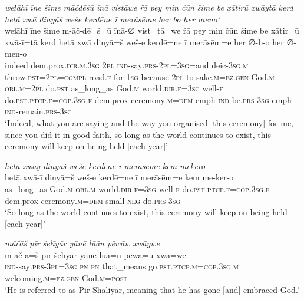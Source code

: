 \ea \label{ZP.128}
\textit{weɫāhī īne šime māčdēšū īnā vistāwe řā pey min čūn šime be xātirū xwāytā kerd hetā xwā dinyāš weše kerdēne ī merāsēme her bo her meno’} \\ 
\gll weɫāhī īne šime m-āč-dē=š=ū īnā-∅ vist=tā=we řā pey min čūn šime be xātir=ū xwā-ī=tā kerd hetā xwā dinyā=š weš-e kerdē=ne ī merāsēm=e her ∅-b-o her ∅-men-o \\ 
 indeed dem.prox\textsc{.dir}\textsc{.m}\textsc{.3sg} \textsc{2pl} \textsc{ind-}say\textsc{.prs}-\textsc{2pl}\textsc{=3sg}=and deic\textsc{-3sg}\textsc{.m} throw\textsc{.pst}=\textsc{2pl}\textsc{=compl} road\textsc{.f} for \textsc{1sg} because \textsc{2pl} to sake\textsc{.m}\textsc{\textsc{=ez.gen}} God\textsc{.m}\textsc{-obl}\textsc{.m}=\textsc{2pl} do\textsc{.pst} as\_long\_as God\textsc{.m} world\textsc{.dir}\textsc{.f}\textsc{=3sg} well\textsc{-f} do\textsc{.pst}\textsc{.ptcp}\textsc{.f}\textsc{=cop}\textsc{.3sg}\textsc{.f} dem.prox ceremony\textsc{.m}\textsc{=dem} emph \textsc{ind-}be\textsc{.prs}\textsc{-3sg} emph \textsc{ind-}remain\textsc{.prs}\textsc{-3sg} \\ 
\glt `Indeed, what you are saying and the way you organised [this ceremony] for me, since you did it in good faith, so long as the world continues to exist, this ceremony will keep on being held [each year]'
\z 
 
\ea \label{ZP.130}
\textit{hetā xwāy dinyāš weše kerdēne ī merāsēme kem mekero} \\ 
\gll hetā xwā-ī dinyā=š weš-e kerdē=ne ī merāsēm=e kem me-ker-o \\ 
 as\_long\_as God\textsc{.m}\textsc{-obl}\textsc{.m} world\textsc{.dir}\textsc{.f}\textsc{=3sg} well\textsc{-f} do\textsc{.pst}\textsc{.ptcp}\textsc{.f}\textsc{=cop}\textsc{.3sg}\textsc{.f} dem.prox ceremony\textsc{.m}\textsc{=dem} small \textsc{neg-}do\textsc{.prs}\textsc{-3sg} \\ 
\glt `So long as the world continues to exist, this ceremony will keep on being held [each year]'
\z 
 
\ea \label{ŽP.3}
\textit{māčāš pīr šelīyār yānē lūān pēwāw xwāywe} \\ 
\gll m-āč-ā=š pīr šelīyār yānē lūā=n pēwā=ū xwā=we \\ 
 \textsc{ind-}say\textsc{.prs}\textsc{-3pl}\textsc{=3sg} \textsc{pn} \textsc{pn} that\_means go\textsc{.pst}\textsc{.ptcp}\textsc{.m}\textsc{=cop}\textsc{.3sg}\textsc{.m} welcoming\textsc{.m}\textsc{\textsc{=ez.gen}} God\textsc{.m}\textsc{=\textsc{post}} \\ 
\glt `He is referred to as Pir Shaliyar, meaning that he has gone [and] embraced God.'
\z 
 
